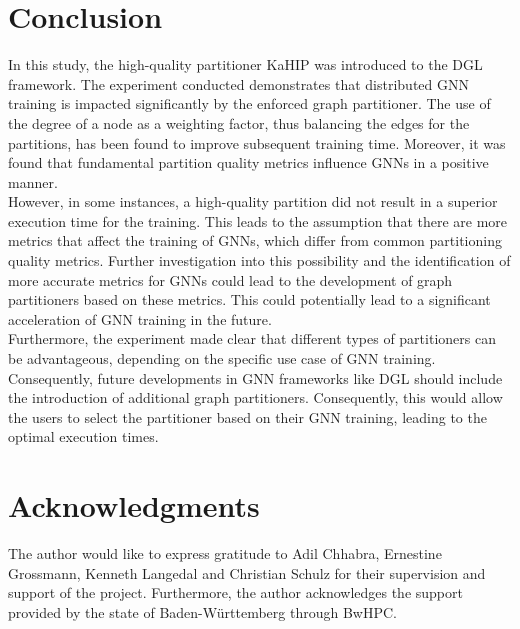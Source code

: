 \documentclass[acmsmall,nonacm,screen,review]{acmart}
\begin{document}
\section{Conclusion}
In this study, the high-quality partitioner KaHIP was introduced to the DGL framework. The experiment conducted demonstrates that distributed GNN training is impacted significantly by the enforced graph partitioner. The use of the degree of a node as a weighting factor, thus balancing the edges for the partitions, has been found to improve subsequent training time. Moreover, it was found that fundamental partition quality metrics influence GNNs in a positive manner.\\
However, in some instances, a high-quality partition did not result in a superior execution time for the training. This leads to the assumption that there are more metrics that affect the training of GNNs, which differ from common partitioning quality metrics. Further investigation into this possibility and the identification of more accurate metrics for GNNs could lead to the development of graph partitioners based on these metrics. This could potentially lead to a significant acceleration of GNN training in the future.\\
Furthermore, the experiment made clear that different types of partitioners can be advantageous, depending on the specific use case of GNN training. Consequently, future developments in GNN frameworks like DGL should include the introduction of additional graph partitioners. Consequently, this would allow the users to select the partitioner based on their GNN training, leading to the optimal execution times.
\section{Acknowledgments}
The author would like to express gratitude to Adil Chhabra, Ernestine Grossmann, Kenneth Langedal and Christian Schulz for their supervision and support of the project. Furthermore, the author acknowledges the support provided by the state of Baden-Württemberg through BwHPC.


\end{document}
